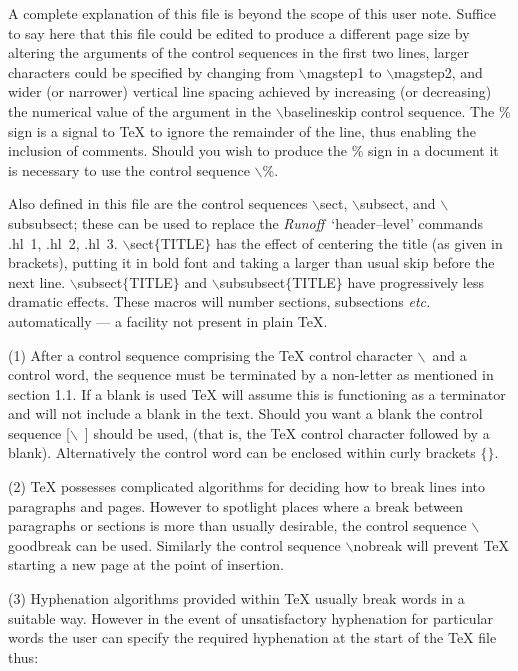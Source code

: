 \rm
A complete explanation of this file is beyond the scope of this
user note.
Suffice to say here that this file could be edited to produce a different
page size by altering the arguments of the control sequences in the first two
lines, larger characters could be specified by changing from $\backslash$magstep1 to
$\backslash$magstep2, and wider (or narrower) vertical line spacing achieved 
by increasing
(or decreasing) the numerical value of the argument in the
$\backslash$baselineskip control sequence. 
The \% sign is a signal to {\TeX} to ignore the remainder of the line, 
thus enabling the inclusion of comments.
Should you wish to produce the \% sign in a document it is necessary to use the
control sequence $\backslash$\%.

Also defined in this file are the control sequences $\backslash$sect,
$\backslash$subsect, and $\backslash$subsubsect; these can be used to 
replace the {\it Runoff}\ 
`header--level' commands .hl~1, .hl~2, .hl~3.
$\backslash$sect$\{$TITLE$\}$  has 
the effect of centering the
title (as given in brackets), putting it in bold font and taking a larger than
usual skip before the next line.
$\backslash$subsect$\{$TITLE$\}$ and $\backslash$subsubsect$\{$TITLE$\}$ 
have progressively less dramatic effects.
These macros will number sections, subsections {\it etc.} automatically --- 
a facility not present in plain \TeX.


\item{(1)} After a control sequence comprising the {\TeX} control character $\backslash$\ 
and a control word, the sequence must be terminated by
a non-letter as mentioned in section 1.1.
If a blank is used {\TeX} will assume this is functioning as a
terminator and will not include a blank in the text.
Should you want a blank the control sequence [$\backslash$\ ] should
be used, (that is, the {\TeX} control character followed by a blank).
Alternatively the control word can be enclosed within curly brackets $\{ \}$.

\item{(2)} {\TeX} possesses complicated algorithms for deciding how to break
lines into paragraphs and pages.
However to spotlight places where a break between paragraphs or
sections is more than usually desirable, the  control sequence $\backslash$goodbreak
can be used.
Similarly the control sequence $\backslash$nobreak will prevent {\TeX} starting a new
page at the point of insertion.

\item{(3)} Hyphenation algorithms provided within {\TeX} usually break words in
a suitable way.
However in the event of unsatisfactory hyphenation for particular words
the user can specify the required hyphenation at the start of the {\TeX} 
file thus:
\medskip
{}



